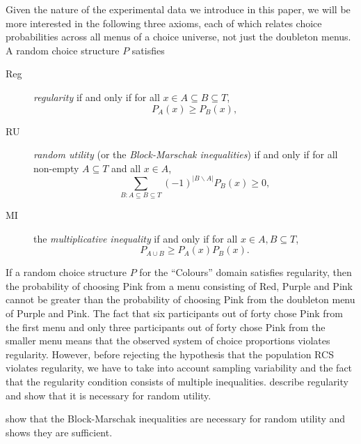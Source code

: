 \documentclass[11pt,letter]{article}
\newcommand{\menus}{menus}
\begin{document}
Given the nature of the experimental data we introduce in this paper, we will be more interested in the following three axioms, each of which relates choice probabilities across all \menus{} of a choice universe, not just the doubleton \menus{}.
A random choice structure $P$ satisfies
\begin{description}
	\item[Reg] {\em regularity} if and only if for all $x \in A \subseteq B \subseteq T$,
	\[
		P_A(x) \geq P_B(x),
	\]
	\item[RU] {\em random utility} (or the {\em Block-Marschak inequalities}) if and only if for all non-empty
	$A \subseteq T$ and all $x \in A$,
	\begin{equation}
		\sum_{B \colon A \subseteq B \subseteq T} (-1)^{|B \backslash A|} P_B(x) \geq 0,
	\end{equation}
  \item[MI] the {\em multiplicative inequality} if and only if for all $x \in A, B \subseteq T$,
	\[
		P_{A \cup B} \geq P_A(x) P_B(x).
	\]
\end{description}
If a random choice structure $P$ for the ``Colours'' domain satisfies regularity, then the probability of choosing Pink from a menu consisting of Red, Purple and Pink cannot be greater than the probability of choosing Pink from the doubleton menu of Purple and Pink.
The fact that six participants out of forty chose Pink from the first menu and only three participants out of forty chose Pink from the smaller menu means that the observed system of choice proportions violates regularity.
However, before rejecting the hypothesis that the population RCS violates regularity, we have to take into account sampling variability and the fact that the regularity condition consists of multiple inequalities.
 describe regularity and show that it is necessary for random utility.

 show that the Block-Marschak inequalities are necessary for random utility and  shows they are sufficient.
\end{document}
